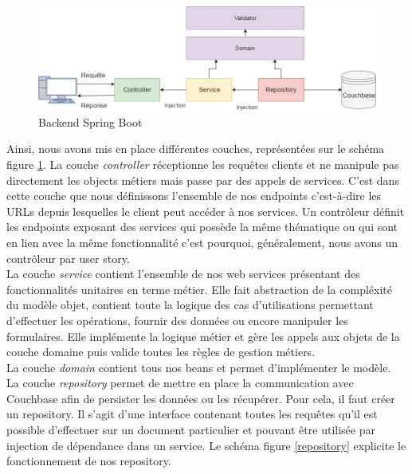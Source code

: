 \begin{figure}[h!]
	\includegraphics[scale=0.50]{images/travailBP1818/architecture/spring.png}
	\centering
	\caption{Backend Spring Boot}
	\label{spring}
\end{figure}
	
	Ainsi, nous avons mis en place différentes couches, représentées sur le schéma figure \ref{spring}. La couche \textit{controller} réceptionne les requêtes clients et ne manipule pas directement les objects métiers mais passe par des appels de services. C'est dans cette couche que nous définissons l'ensemble de nos endpoints c'est-à-dire les URLs depuis lesquelles le client peut accéder à nos services. Un contrôleur définit les endpoints exposant des services qui possède la même thématique ou qui sont en lien avec la même fonctionnalité c'est pourquoi, généralement, nous avons un contrôleur par user story. \\
	
	La couche \textit{service} contient l'ensemble de nos web services présentant des fonctionnalités unitaires en terme métier. Elle fait abstraction de la compléxité du modèle objet, contient toute la logique des cas d'utilisations permettant d'effectuer les opérations, fournir des données ou encore manipuler les formulaires. Elle implémente la logique métier et gère les appels aux objets de la couche domaine puis valide toutes les règles de gestion métiers. \\
	
	La couche \textit{domain} contient tous nos beans et permet d'implémenter le modèle. \\
	
	La couche \textit{repository} permet de mettre en place la communication avec Couchbase afin de persister les données ou les récupérer. Pour cela, il faut créer un repository. Il s'agit d'une interface contenant toutes les requêtes qu'il est possible d'effectuer sur un document particulier et pouvant être utilisée par injection de dépendance dans un service. Le schéma figure \ref{repository} explicite le fonctionnement de nos repository. \\
	
